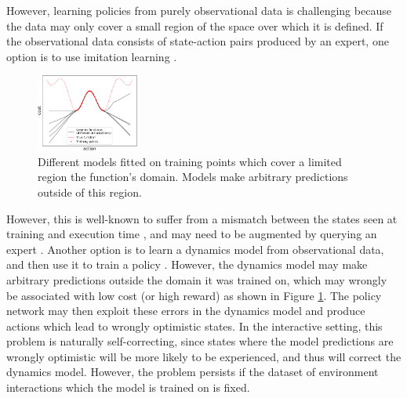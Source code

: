 \documentclass{article} %
\begin{document}
However, learning policies from purely observational data is challenging because the data may only cover a small region of the space over which it is defined.
If the observational data consists of state-action pairs produced by an expert, one option is to use imitation learning \citep{Pomerleau91}.
\begin{figure}
  \includegraphics[width=0.3\textwidth]{figures/driving/uncertainty_example2-crop.pdf}
  \caption{\label{simple-example}Different models fitted on training points which cover a limited region the function's domain. Models make arbitrary predictions outside of this region.}
\end{figure}
However, this is well-known to suffer from a mismatch between the states seen at training and execution time \citep{Ross2010EfficientRF}, and may need to be augmented by querying an expert \citep{Dagger}.
Another option is to learn a dynamics model from observational data, and then use it to train a policy \citep{Nguyen1989}. However, the dynamics model may make arbitrary predictions outside the domain it was trained on, which may wrongly be associated with low cost (or high reward) as shown in Figure \ref{simple-example}. The policy network may then exploit these errors in the dynamics model and produce actions which lead to wrongly optimistic states. In the interactive setting, this problem is naturally self-correcting, since states where the model predictions are wrongly optimistic will be more likely to be experienced, and thus will correct the dynamics model. However, the problem persists if the dataset of environment interactions which the model is trained on is fixed.
\end{document}

